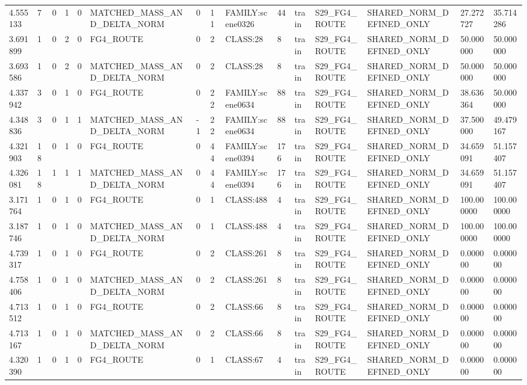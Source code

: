 \begin{tabular}{lllllllllllllll}
4.555133 & 7 & 0 & 1 & 0 & MATCHED\_MASS\_AND\_DELTA\_NORM & 0 & 11 & FAMILY:scene0326 & 44 & train & S29\_FG4\_ROUTE & SHARED\_NORM\_DEFINED\_ONLY & 27.272727 & 35.714286 \\
3.691899 & 1 & 0 & 2 & 0 & FG4\_ROUTE & 0 & 2 & CLASS:28 & 8 & train & S29\_FG4\_ROUTE & SHARED\_NORM\_DEFINED\_ONLY & 50.000000 & 50.000000 \\
3.693586 & 1 & 0 & 2 & 0 & MATCHED\_MASS\_AND\_DELTA\_NORM & 0 & 2 & CLASS:28 & 8 & train & S29\_FG4\_ROUTE & SHARED\_NORM\_DEFINED\_ONLY & 50.000000 & 50.000000 \\
4.337942 & 3 & 0 & 1 & 0 & FG4\_ROUTE & 0 & 22 & FAMILY:scene0634 & 88 & train & S29\_FG4\_ROUTE & SHARED\_NORM\_DEFINED\_ONLY & 38.636364 & 50.000000 \\
4.348836 & 3 & 0 & 1 & 1 & MATCHED\_MASS\_AND\_DELTA\_NORM & -1 & 22 & FAMILY:scene0634 & 88 & train & S29\_FG4\_ROUTE & SHARED\_NORM\_DEFINED\_ONLY & 37.500000 & 49.479167 \\
4.321903 & 18 & 0 & 1 & 0 & FG4\_ROUTE & 0 & 44 & FAMILY:scene0394 & 176 & train & S29\_FG4\_ROUTE & SHARED\_NORM\_DEFINED\_ONLY & 34.659091 & 51.157407 \\
4.326081 & 18 & 1 & 1 & 1 & MATCHED\_MASS\_AND\_DELTA\_NORM & 0 & 44 & FAMILY:scene0394 & 176 & train & S29\_FG4\_ROUTE & SHARED\_NORM\_DEFINED\_ONLY & 34.659091 & 51.157407 \\
3.171764 & 1 & 0 & 1 & 0 & FG4\_ROUTE & 0 & 1 & CLASS:488 & 4 & train & S29\_FG4\_ROUTE & SHARED\_NORM\_DEFINED\_ONLY & 100.000000 & 100.000000 \\
3.187746 & 1 & 0 & 1 & 0 & MATCHED\_MASS\_AND\_DELTA\_NORM & 0 & 1 & CLASS:488 & 4 & train & S29\_FG4\_ROUTE & SHARED\_NORM\_DEFINED\_ONLY & 100.000000 & 100.000000 \\
4.739317 & 1 & 0 & 1 & 0 & FG4\_ROUTE & 0 & 2 & CLASS:261 & 8 & train & S29\_FG4\_ROUTE & SHARED\_NORM\_DEFINED\_ONLY & 0.000000 & 0.000000 \\
4.758406 & 1 & 0 & 1 & 0 & MATCHED\_MASS\_AND\_DELTA\_NORM & 0 & 2 & CLASS:261 & 8 & train & S29\_FG4\_ROUTE & SHARED\_NORM\_DEFINED\_ONLY & 0.000000 & 0.000000 \\
4.713512 & 1 & 0 & 1 & 0 & FG4\_ROUTE & 0 & 2 & CLASS:66 & 8 & train & S29\_FG4\_ROUTE & SHARED\_NORM\_DEFINED\_ONLY & 0.000000 & 0.000000 \\
4.713167 & 1 & 0 & 1 & 0 & MATCHED\_MASS\_AND\_DELTA\_NORM & 0 & 2 & CLASS:66 & 8 & train & S29\_FG4\_ROUTE & SHARED\_NORM\_DEFINED\_ONLY & 0.000000 & 0.000000 \\
4.320390 & 1 & 0 & 1 & 0 & FG4\_ROUTE & 0 & 1 & CLASS:67 & 4 & train & S29\_FG4\_ROUTE & SHARED\_NORM\_DEFINED\_ONLY & 0.000000 & 0.000000 \\

\end{tabular}
